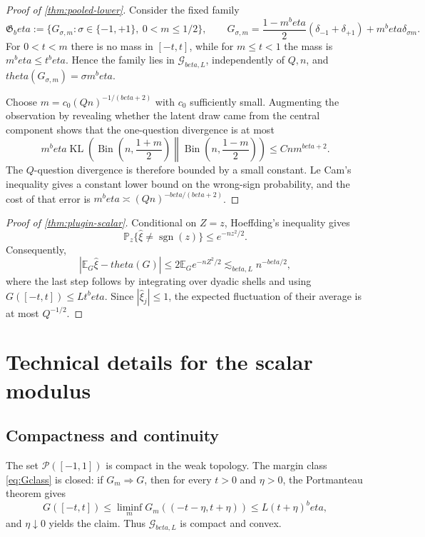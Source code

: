 \documentclass[11pt]{article}
\def\beta{beta}%
\def\theta{theta}%
\newcommand{\Pp}{\mathbb P}
\newcommand{\E}{\mathbb E}
\newcommand{\sgn}{\operatorname{sgn}}
\newcommand{\KL}{\operatorname{KL}}
\newcommand{\Bin}{\operatorname{Bin}}
\newcommand{\calG}{\mathcal G}
\begin{document}
\begin{proof}[Proof of \cref{thm:pooled-lower}]
Consider the fixed family
\[
\mathfrak G_\beta
:=
\{G_{\sigma,m}:\sigma\in\{-1,+1\},\ 0<m\le1/2\},
\qquad
G_{\sigma,m}
=
\frac{1-m^\beta}{2}(\delta_{-1}+\delta_{+1})
+m^\beta\delta_{\sigma m}.
\]
For $0<t<m$ there is no mass in $[-t,t]$, while for $m\le t<1$ the mass is $m^\beta\le t^\beta$.  Hence the family lies in $\calG_{\beta,L}$, independently of $Q,n$, and $\theta(G_{\sigma,m})=\sigma m^\beta$.

Choose $m=c_0(Qn)^{-1/(\beta+2)}$ with $c_0$ sufficiently small.  Augmenting the observation by revealing whether the latent draw came from the central component shows that the one-question divergence is at most
\[
m^\beta
\KL\!\left(
\Bin\left(n,\frac{1+m}{2}\right)
\middle\|
\Bin\left(n,\frac{1-m}{2}\right)
\right)
\le Cnm^{\beta+2}.
\]
The $Q$-question divergence is therefore bounded by a small constant.  Le Cam's inequality gives a constant lower bound on the wrong-sign probability, and the cost of that error is $m^\beta\asymp(Qn)^{-\beta/(\beta+2)}$.
\end{proof}

\begin{proof}[Proof of \cref{thm:plugin-scalar}]
Conditional on $Z=z$, Hoeffding's inequality gives
\[
\Pp_z\{\widehat\xi\ne\sgn(z)\}
\le e^{-nz^2/2}.
\]
Consequently,
\[
|\E_G\widehat\xi-\theta(G)|
\le2\E_G e^{-nZ^2/2}
\lesssim_{\beta,L}n^{-\beta/2},
\]
where the last step follows by integrating over dyadic shells and using $G([-t,t])\le Lt^\beta$.  Since $|\widehat\xi_j|\le1$, the expected fluctuation of their average is at most $Q^{-1/2}$.
\end{proof}

\section{Technical details for the scalar modulus}
\label{app:scalar-modulus}

\subsection{Compactness and continuity}

The set $\mathcal P([-1,1])$ is compact in the weak topology.  The margin class \eqref{eq:Gclass} is closed: if $G_m\Rightarrow G$, then for every $t>0$ and $\eta>0$, the Portmanteau theorem gives
\[
G([-t,t])
\le
\liminf_m G_m((-t-\eta,t+\eta))
\le
L(t+\eta)^\beta,
\]
and $\eta\downarrow0$ yields the claim.  Thus $\calG_{\beta,L}$ is compact and convex.
\end{document}
